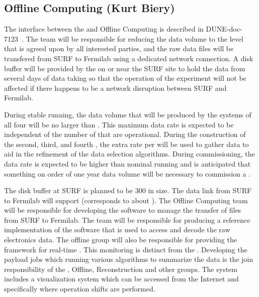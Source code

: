 \subsection{Offline Computing (Kurt Biery)}
\label{sec:fd-daq-intfc-fnal-cmptg}

The interface between the  and Offline Computing is
described in DUNE-doc-7123~\cite{docdb-7123}.
The  team will be responsible for reducing the data volume
to the level that is agreed upon by all interested parties, and the
raw data files will be transfered from SURF to Fermilab using a
dedicated network connection.
A disk buffer will be provided by the  on or near the SURF
site to hold the data from several days of data taking so that the
operation of the experiment will not be affected if there happens to
be a network disruption between SURF and Fermilab.

During stable running, the data volume that will be produced by the
 systems of all four  will be no larger
than \offsitepbpy.
This maximum data rate is expected to be independent of the number of
 that are operational.
During the construction of the second, third, and fourth
, the extra rate per  will be used
to gather data to aid in the refinement of the data selection
algorithms.
During commissioning, the data rate is expected to be higher than
nominal running and is anticipated that something on order of one year
data volume will be necessary to commission a .

The disk buffer at SURF is planned to be \SI{300}{\TB} in size.
The data link from SURF to Fermilab will support \surffnalbw
(\offsitepbpy corresponds to about \offsitegbps).
The Offline Computing team will be responsible for developing the
software to manage the transfer of files from SURF to Fermilab.
The  team will be responsible for producing a reference
implementation of the software that is used to access and decode the
raw electronics data.
The offline group will also be responsible for providing the framework
for real-time . 
This monitoring is distinct from the .
Developing the payload jobs which running various algorithms to
summarize the data is the join responsibility of the , Offline,
Reconstruction and other groups.
The  system includes a visualization system which can be
accessed from the Internet and specifically where operation shifts are
performed.

